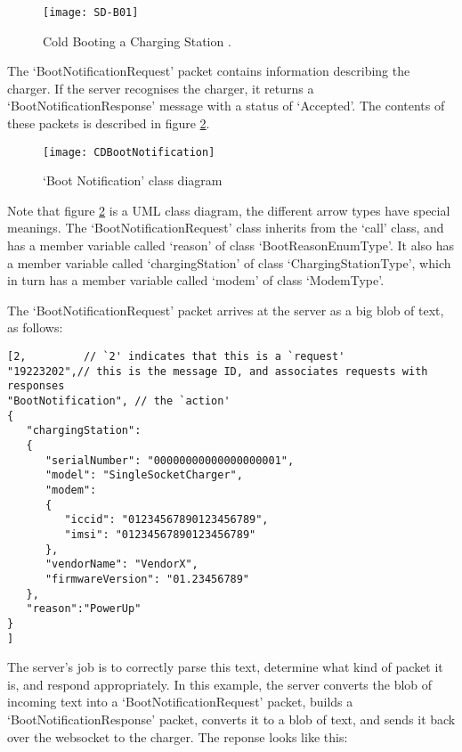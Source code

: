 \documentclass[12pt,openany,a4paper]{book}
\begin{document}
	\begin{center}
		\begin{figure}[H]
			\texttt{[image: SD-B01]}
			\caption{Cold Booting a Charging Station \cite{ocpp2b}.}
			\label{fig:SD-B01}
		\end{figure}
	\end{center}
	
The `BootNotificationRequest' packet contains information describing the charger. If the server recognises the charger, it returns a `BootNotificationResponse' message with a status of `Accepted'. The contents of these packets is described in figure \ref{fig:CDBootNotification}.

	\begin{center}
		\begin{figure}[H]
			\texttt{[image: CDBootNotification]}
			\caption{`Boot Notification' class diagram}
			\label{fig:CDBootNotification}
		\end{figure}
	\end{center}
	
Note that figure \ref{fig:CDBootNotification} is a UML class diagram, the different arrow types have special meanings. The `BootNotificationRequest' class inherits from the `call' class, and has a member variable called `reason' of class `BootReasonEnumType'. It also has a member variable called `chargingStation' of class `ChargingStationType', which in turn has a member variable called `modem' of class `ModemType'.

\pagebreak
The `BootNotificationRequest' packet arrives at the server as a big blob of text, as follows:
\begin{verbatim}
[2,	        // `2' indicates that this is a `request'
"19223202",// this is the message ID, and associates requests with responses
"BootNotification", // the `action'
{
   "chargingStation":
   {
      "serialNumber": "00000000000000000001",
      "model": "SingleSocketCharger",
      "modem":
      {
         "iccid": "01234567890123456789",
         "imsi": "01234567890123456789"
      },
      "vendorName": "VendorX",
      "firmwareVersion": "01.23456789"
   },
   "reason":"PowerUp"
}
]
\end{verbatim}

The server's job is to correctly parse this text, determine what kind of packet it is, and respond appropriately. In this example, the server converts the blob of incoming text into a `BootNotificationRequest' packet, builds a `BootNotificationResponse' packet, converts it to a blob of text, and sends it back over the websocket to the charger. The reponse looks like this:
\end{document}
